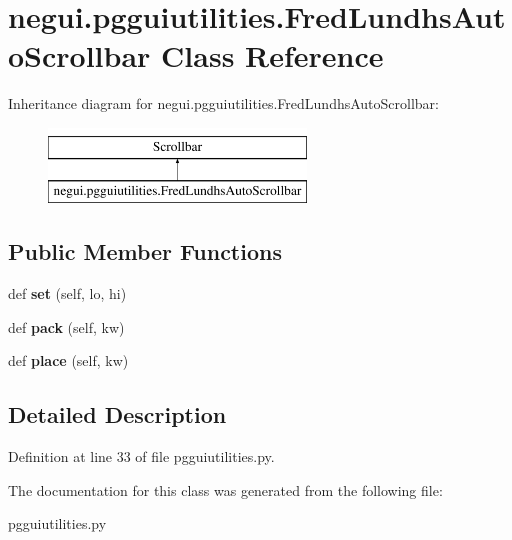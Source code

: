 \hypertarget{classnegui_1_1pgguiutilities_1_1FredLundhsAutoScrollbar}{}\section{negui.\+pgguiutilities.\+Fred\+Lundhs\+Auto\+Scrollbar Class Reference}
\label{classnegui_1_1pgguiutilities_1_1FredLundhsAutoScrollbar}
Inheritance diagram for negui.\+pgguiutilities.\+Fred\+Lundhs\+Auto\+Scrollbar\+:\begin{figure}[H]
\begin{center}
\leavevmode
\includegraphics[height=2.000000cm]{classnegui_1_1pgguiutilities_1_1FredLundhsAutoScrollbar}
\end{center}
\end{figure}
\subsection*{Public Member Functions}
\begin{DoxyCompactItemize}
\item 
def {\bfseries set} (self, lo, hi)\hypertarget{classnegui_1_1pgguiutilities_1_1FredLundhsAutoScrollbar_aba2e2b98ba2b20fe53fed36d35295acb}{}\label{classnegui_1_1pgguiutilities_1_1FredLundhsAutoScrollbar_aba2e2b98ba2b20fe53fed36d35295acb}

\item 
def {\bfseries pack} (self, kw)\hypertarget{classnegui_1_1pgguiutilities_1_1FredLundhsAutoScrollbar_ab584fb578f832316f881cfdd4ed157e7}{}\label{classnegui_1_1pgguiutilities_1_1FredLundhsAutoScrollbar_ab584fb578f832316f881cfdd4ed157e7}

\item 
def {\bfseries place} (self, kw)\hypertarget{classnegui_1_1pgguiutilities_1_1FredLundhsAutoScrollbar_a5b729724cf7818ec6776fdfee6104fb8}{}\label{classnegui_1_1pgguiutilities_1_1FredLundhsAutoScrollbar_a5b729724cf7818ec6776fdfee6104fb8}

\end{DoxyCompactItemize}


\subsection{Detailed Description}


Definition at line 33 of file pgguiutilities.\+py.



The documentation for this class was generated from the following file\+:\begin{DoxyCompactItemize}
\item 
pgguiutilities.\+py\end{DoxyCompactItemize}

